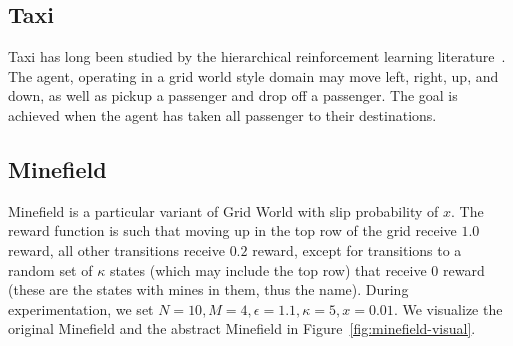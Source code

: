 \subsection{Taxi}

Taxi has long been studied by the hierarchical reinforcement learning literature~\cite{dietterich2000hierarchical}. The agent, operating in a grid world style domain may move left, right, up, and down, as well as pickup a passenger and drop off a passenger. The goal is achieved when the agent has taken all passenger to their destinations.






\subsection{Minefield}

Minefield is a particular variant of Grid World \cite{russell1995modern} with slip probability of $x$. The reward function is such that moving up in the top row of the grid receive $1.0$ reward, all other transitions receive $0.2$ reward, except for transitions to a random set of $\kappa$ states (which may include the top row) that receive $0$ reward (these are the states with mines in them, thus the name). During experimentation, we set $N=10, M=4, \epsilon=1.1, \kappa = 5, x = 0.01$. We visualize the original Minefield and the abstract Minefield in Figure~\ref{fig:minefield-visual}.

